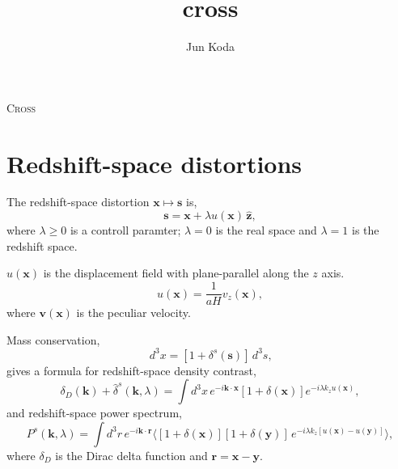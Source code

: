 \documentclass[a4paper,11pt, fleqn]{article}
\title{cross}
\author{Jun Koda}
\date{}
\begin{document}
%
%
\vspace{0.3 \paperheight}

\begin{center}
  {\Huge \textsc{Cross}}
\end{center}

\tableofcontents

\sectionfont{\sffamily\Huge\color{Green}\selectfont}
\subsectionfont{\sffamily\color{Green}\selectfont}
\subsubsectionfont{\sffamily\color{Green}\selectfont}
\paragraphfont{\sffamily\color{Green}\selectfont}

%
%
\newpage

\section{Redshift-space distortions}

The redshift-space distortion $\bm{x} \mapsto \bm{s}$ is,
%
\begin{equation}
  \bm{s} = \bm{x} + \lambda u(\bm{x}) \, \hat{\bm{z}},
\end{equation}
where $\lambda \ge 0$ is a controll paramter; $\lambda = 0$ is the real space and $\lambda = 1$ is the redshift space.

$u(\bm{x})$ is the displacement field with plane-parallel along the $z$ axis.
\begin{equation}
  u(\bm{x}) = \frac{1}{aH} v_z(\bm{x}),
\end{equation}
where $\bm{v}(\bm{x})$ is the peculiar velocity.

\vspace{5mm}

Mass conservation,
%
\begin{equation}
  [1 + \delta(\bm{x})] \,d^3 x = [1 + \delta^s(\bm{s})] \,d^3 s,
\end{equation}
%
gives a formula for redshift-space density contrast,
%
\begin{equation}
  \label{eq:delta-s}
  \delta_D(\bm{k}) + \hat{\delta}^s(\bm{k}, \lambda)
  = \int \! d^3 x \, e^{-i\bm{k}\cdot\bm{x}} [1 + \delta(\bm{x})]
    e^{-i \lambda k_z u(\bm{x})},
\end{equation}
%
and redshift-space power spectrum,
%
\begin{equation}
  P^s(\bm{k}, \lambda) = \int \! d^3 r \, e^{-i\bm{k}\cdot\bm{r}}
  \Big\langle
      [1 + \delta(\bm{x})][1 + \delta(\bm{y})] \,
      e^{-i \lambda k_z [u(\bm{x}) - u(\bm{y})]}\Big\rangle,
\end{equation}
where $\delta_D$ is the Dirac delta function and $\bm{r} = \bm{x} - \bm{y}$.\\
\end{document}
